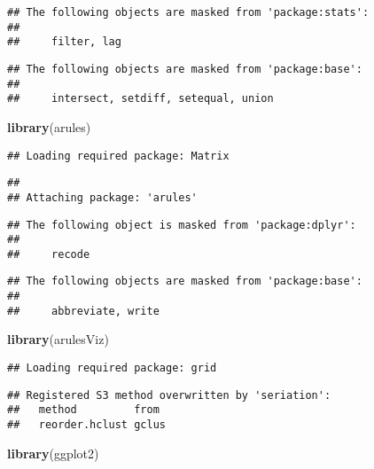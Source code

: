 \documentclass[]{article}
\newenvironment{Shaded}{\begin{snugshade}}{\end{snugshade}}
\newcommand{\KeywordTok}[1]{\textcolor[rgb]{0.13,0.29,0.53}{\textbf{#1}}}
\newcommand{\NormalTok}[1]{#1}
\begin{document}
\begin{verbatim}
## The following objects are masked from 'package:stats':
## 
##     filter, lag
\end{verbatim}

\begin{verbatim}
## The following objects are masked from 'package:base':
## 
##     intersect, setdiff, setequal, union
\end{verbatim}

\begin{Shaded}
\begin{Highlighting}[]
\KeywordTok{library}\NormalTok{(arules)}
\end{Highlighting}
\end{Shaded}

\begin{verbatim}
## Loading required package: Matrix
\end{verbatim}

\begin{verbatim}
## 
## Attaching package: 'arules'
\end{verbatim}

\begin{verbatim}
## The following object is masked from 'package:dplyr':
## 
##     recode
\end{verbatim}

\begin{verbatim}
## The following objects are masked from 'package:base':
## 
##     abbreviate, write
\end{verbatim}

\begin{Shaded}
\begin{Highlighting}[]
\KeywordTok{library}\NormalTok{(arulesViz)}
\end{Highlighting}
\end{Shaded}

\begin{verbatim}
## Loading required package: grid
\end{verbatim}

\begin{verbatim}
## Registered S3 method overwritten by 'seriation':
##   method         from 
##   reorder.hclust gclus
\end{verbatim}

\begin{Shaded}
\begin{Highlighting}[]
\KeywordTok{library}\NormalTok{(ggplot2)}
\end{Highlighting}
\end{Shaded}
\end{document}
